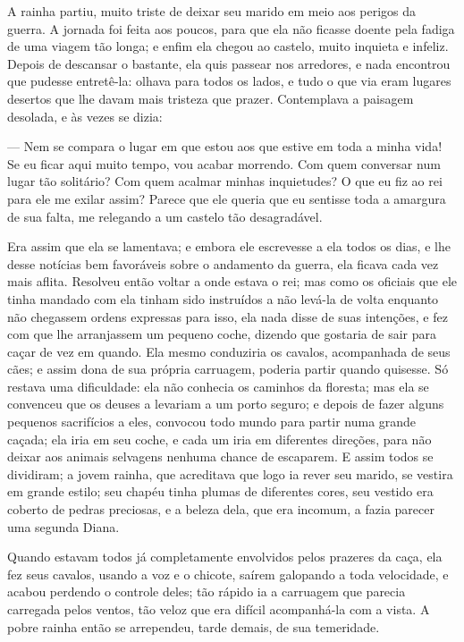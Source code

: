 A rainha partiu, muito triste de deixar seu marido em meio aos perigos
da guerra. A jornada foi feita aos poucos, para que ela não ficasse
doente pela fadiga de uma viagem tão longa; e enfim ela chegou ao
castelo, muito inquieta e infeliz. Depois de descansar o bastante,
ela quis passear nos arredores, e nada encontrou que pudesse
entretê-la: olhava para todos os lados, e tudo o que via eram lugares
desertos que lhe davam mais tristeza que prazer. Contemplava a
paisagem desolada, e às vezes se dizia:

— Nem se compara o lugar em que estou aos que estive em toda a minha
vida! Se eu ficar aqui muito tempo, vou acabar morrendo. Com quem
conversar num lugar tão solitário? Com quem acalmar minhas
inquietudes? O que eu fiz ao rei para ele me exilar assim? Parece que
ele queria que eu sentisse toda a amargura de sua falta, me relegando
a um castelo tão desagradável.

Era assim que ela se lamentava; e embora ele escrevesse a ela todos os
dias, e lhe desse notícias bem favoráveis sobre o andamento da
guerra, ela ficava cada vez mais aflita. Resolveu então voltar a onde
estava o rei; mas como os oficiais que ele tinha mandado com ela
tinham sido instruídos a não levá-la de volta enquanto não chegassem
ordens expressas para isso, ela nada disse de suas intenções, e fez
com que lhe arranjassem um pequeno coche, dizendo que gostaria de
sair para caçar de vez em quando. Ela mesmo conduziria os cavalos,
acompanhada de seus cães; e assim dona de sua própria carruagem,
poderia partir quando quisesse. Só restava uma dificuldade: ela não
conhecia os caminhos da floresta; mas ela se convenceu que os deuses
a levariam a um porto seguro; e depois de fazer alguns pequenos
sacrifícios a eles, convocou todo mundo para partir numa grande
caçada; ela iria em seu coche, e cada um iria em diferentes direções,
para não deixar aos animais selvagens nenhuma chance de escaparem. E
assim todos se dividiram; a jovem rainha, que acreditava que logo ia
rever seu marido, se vestira em grande estilo; seu chapéu tinha
plumas de diferentes cores, seu vestido era coberto de pedras
preciosas, e a beleza dela, que era incomum, a fazia parecer uma
segunda Diana.

Quando estavam todos já completamente envolvidos pelos prazeres da
caça, ela fez seus cavalos, usando a voz e o chicote, saírem
galopando a toda velocidade, e acabou perdendo o controle deles; tão
rápido ia a carruagem que parecia carregada pelos ventos, tão veloz
que era difícil acompanhá-la com a vista. A pobre rainha então se
arrependeu, tarde demais, de sua temeridade.

